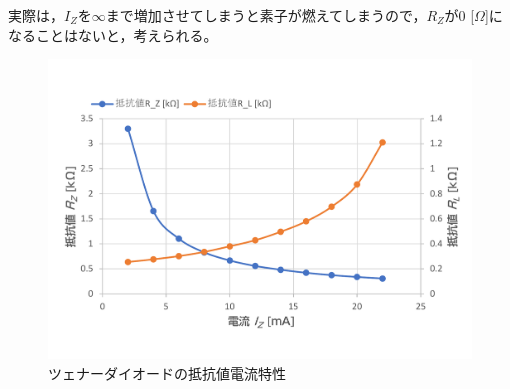 \begin{enumerate}
		実際は，$I_Z$を$\infty$まで増加させてしまうと素子が燃えてしまうので，$R_Z$が0 [$\Omega$]になることはないと，考えられる。


		\begin{figure}[!h]
			\centering
			\includegraphics[width=13cm]{./figs/G-zener_IZ-RZRL.pdf}
			\caption{ツェナーダイオードの抵抗値電流特性}
			\label{fig:zener_IZ-RZRL}
		\end{figure}

	\end{enumerate}
